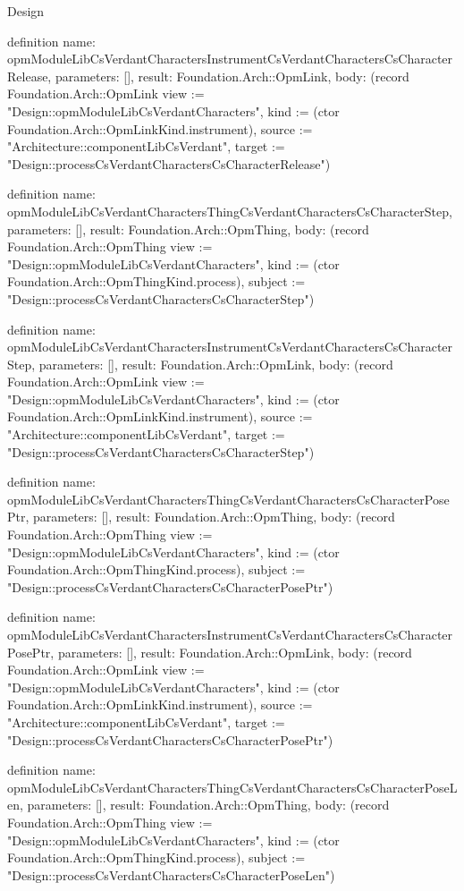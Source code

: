\begin{lexlean}{Design}
\begin{semanticmodule}
definition{
  name: opmModuleLibCsVerdantCharactersInstrumentCsVerdantCharactersCsCharacterRelease,
  parameters: [],
  result: Foundation.Arch::OpmLink,
  body: (record Foundation.Arch::OpmLink {view := "Design::opmModuleLibCsVerdantCharacters", kind := (ctor Foundation.Arch::OpmLinkKind.instrument), source := "Architecture::componentLibCsVerdant", target := "Design::processCsVerdantCharactersCsCharacterRelease"})
}

definition{
  name: opmModuleLibCsVerdantCharactersThingCsVerdantCharactersCsCharacterStep,
  parameters: [],
  result: Foundation.Arch::OpmThing,
  body: (record Foundation.Arch::OpmThing {view := "Design::opmModuleLibCsVerdantCharacters", kind := (ctor Foundation.Arch::OpmThingKind.process), subject := "Design::processCsVerdantCharactersCsCharacterStep"})
}

definition{
  name: opmModuleLibCsVerdantCharactersInstrumentCsVerdantCharactersCsCharacterStep,
  parameters: [],
  result: Foundation.Arch::OpmLink,
  body: (record Foundation.Arch::OpmLink {view := "Design::opmModuleLibCsVerdantCharacters", kind := (ctor Foundation.Arch::OpmLinkKind.instrument), source := "Architecture::componentLibCsVerdant", target := "Design::processCsVerdantCharactersCsCharacterStep"})
}

definition{
  name: opmModuleLibCsVerdantCharactersThingCsVerdantCharactersCsCharacterPosePtr,
  parameters: [],
  result: Foundation.Arch::OpmThing,
  body: (record Foundation.Arch::OpmThing {view := "Design::opmModuleLibCsVerdantCharacters", kind := (ctor Foundation.Arch::OpmThingKind.process), subject := "Design::processCsVerdantCharactersCsCharacterPosePtr"})
}

definition{
  name: opmModuleLibCsVerdantCharactersInstrumentCsVerdantCharactersCsCharacterPosePtr,
  parameters: [],
  result: Foundation.Arch::OpmLink,
  body: (record Foundation.Arch::OpmLink {view := "Design::opmModuleLibCsVerdantCharacters", kind := (ctor Foundation.Arch::OpmLinkKind.instrument), source := "Architecture::componentLibCsVerdant", target := "Design::processCsVerdantCharactersCsCharacterPosePtr"})
}

definition{
  name: opmModuleLibCsVerdantCharactersThingCsVerdantCharactersCsCharacterPoseLen,
  parameters: [],
  result: Foundation.Arch::OpmThing,
  body: (record Foundation.Arch::OpmThing {view := "Design::opmModuleLibCsVerdantCharacters", kind := (ctor Foundation.Arch::OpmThingKind.process), subject := "Design::processCsVerdantCharactersCsCharacterPoseLen"})
}


\end{semanticmodule}
\end{lexlean}
